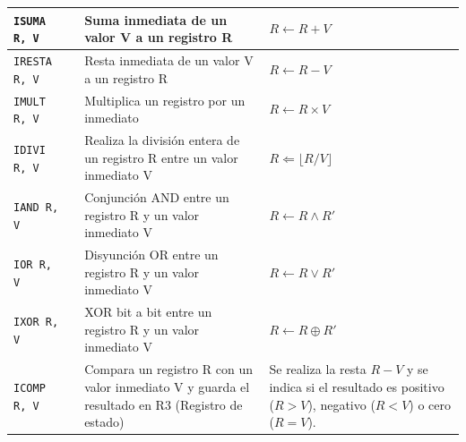\documentclass{article}
\begin{document}
\begin{longtable}{|p{}|p{}|p{}|p{}|}
  \hline
  \texttt{ISUMA R, V}  &  & Suma inmediata de un valor V a un registro R                                                                                                                                                  & $R \leftarrow R + V$                                                                                                \\
  \hline
  \texttt{IRESTA R, V} &  & Resta inmediata de un valor V a un registro R                                                                                                                                                 & $R \leftarrow R - V$                                                                                                \\
  \hline
  \texttt{IMULT R, V}  &  & Multiplica un registro por un inmediato                                                                                                                                                       & $R \leftarrow R \times V$                                                                                           \\
  \hline
  \texttt{IDIVI R, V}  &  & Realiza la división entera de un registro R entre un valor inmediato V                                                                                                                        & $R \Leftarrow \lfloor R / V \rfloor $                                                                               \\
  \hline
  \texttt{IAND R, V}   &  & Conjunción AND entre un registro R y un valor inmediato V                                                                                                                                     & $ R \leftarrow R \wedge R'$                                                                                         \\
  \hline
  \texttt{IOR R, V}    &  & Disyunción OR entre un registro R y un valor inmediato V                                                                                                                                      & $R \leftarrow R \vee R'$                                                                                            \\
  \hline
  \texttt{IXOR R, V}   &  & XOR bit a bit entre un registro R y un valor inmediato V                                                                                                                                      & $R \leftarrow R \oplus R'$                                                                                          \\
  \hline
  \texttt{ICOMP R, V}  &  & Compara un registro R con un valor inmediato V y guarda el resultado en R3 (Registro de estado)                                                                                               & Se realiza la resta $R - V$ y se indica si el resultado es positivo ($R > V$), negativo ($R < V$) o cero ($R = V$). \\
  \hline
\end{longtable}
\end{document}
